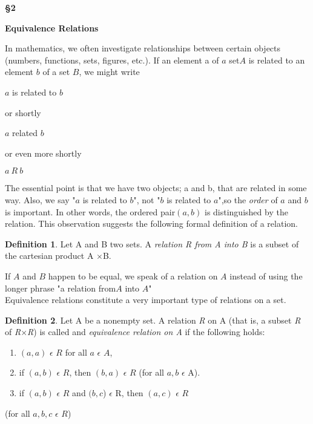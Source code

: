 \documentclass[11pt]{amsbook}
\theoremstyle{definition}
\newtheorem{definition}{Definition}
\begin{document}



\centerline{\textbf{§2}}
\centerline  {\textbf{Equivalence Relations}}

\vspace{1cm}

\noindent In mathematics, we often investigate relationships between  certain
objects (numbers, functions, sets, figures, etc.). If an element a of $a$ set$ A$
is related  to an element $b$ of a set $B$, we might write \\
\centerline  {$a$ is related to $b$ }
or shortly\\
\centerline  {$a$  related  $b$ }
or even more shortly \\
\centerline  {$a \ R \ b$ }

\noindent The essential point is that we have two objects; a and b, that are related
in some way. Also, we say "$a$ is related to $b$", not "$b$ is related to $a$",so
the \textit{order} of $a$ and $b$ is important. In other words, the ordered pair$(a ,b)$
is distinguished by the relation. This observation suggests the following
formal definition of a relation. 
\begin{definition}
	Let A and B two sets. A \textit{relation R from A into B} is a subset of the cartesian product A $\times$B.
\end{definition}
\noindent If $A$ and $B$ happen to be equal, we speak of a relation on $A$ instead of
using the longer phrase "a relation from$A$ into $A$"\\

\noindent Equivalence relations constitute a very important type of relations on a
set. 
\begin{definition}
	Let A be a nonempty set. A relation \textit{R} on A (that is, a subset \textit{R} of \textit{R$\times$R}) is called and \textit{equivalence relation on A} if the following holds:
\end{definition}
\begin{enumerate}[label=(\roman*)]
	\item $(a,a)$ $\epsilon$ $R$ for all $a$ $\epsilon$ $ A$, 
	\item if $(a,b)$ $\epsilon$ $R$, then $(b,a)$ $\epsilon$ $R$ (for all $a,b$ $\epsilon$ A). 
	\item if $(a,b)$ $\epsilon$ $R$ and $(b,c$) $\epsilon$ R, then $(a,c)$ $\epsilon$ $R$ 
\end{enumerate}
(for all $ a,b,c $ $\epsilon$ $R$)
\end{document}
